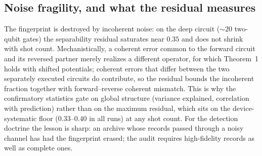 \documentclass[aps,pra,twocolumn,superscriptaddress,nofootinbib]{revtex4-2}
\begin{document}
\subsection{Noise fragility, and what the residual measures}
The fingerprint is destroyed by incoherent noise: on the deep circuit ($\sim20$ two-qubit gates) the separability residual saturates near $0.35$ and does not shrink with shot count. Mechanistically, a coherent error common to the forward circuit and its reversed partner merely realizes a different operator, for which Theorem~1 holds with shifted potentials; coherent errors that differ between the two separately executed circuits do contribute, so the residual bounds the incoherent fraction together with forward--reverse coherent mismatch. This is why the confirmatory statistics gate on global structure (variance explained, correlation with prediction) rather than on the maximum residual, which sits on the device-systematic floor ($0.33$--$0.40$ in all runs) at any shot count. For the detection doctrine the lesson is sharp: an archive whose records passed through a noisy channel has had the fingerprint erased; the audit requires high-fidelity records as well as complete ones.
\end{document}
